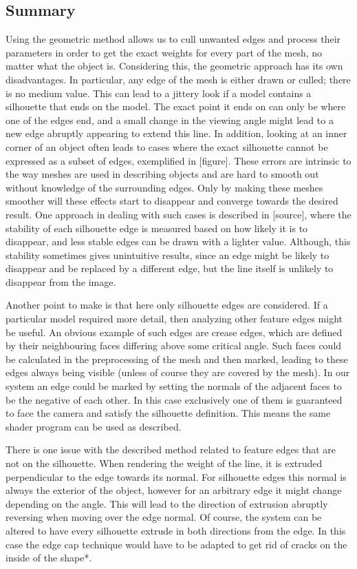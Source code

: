 \documentclass[a4paper, 12pt]{article}
\begin{document}
\subsection{Summary}
Using the geometric method allows us to cull unwanted edges and process their parameters in order to get the exact weights for every part of the mesh, no matter what the object is. Considering this, the geometric approach has its own disadvantages. In particular, any edge of the mesh is either drawn or culled; there is no medium value. This can lead to a jittery look if a model contains a silhouette that ends on the model. The exact point it ends on can only be where one of the edges end, and a small change in the viewing angle might lead to a new edge abruptly appearing to extend this line. In addition, looking at an inner corner of an object often leads to cases where the exact silhouette cannot be expressed as a subset of edges, exemplified in [figure]. These errors are intrinsic to the way meshes are used in describing objects and are hard to smooth out without knowledge of the surrounding edges. Only by making these meshes smoother will these effects start to disappear and converge towards the desired result. One approach in dealing with such cases is described in [source], where the stability of each silhouette edge is measured based on how likely it is to disappear, and less stable edges can be drawn with a lighter value. Although, this stability sometimes gives unintuitive results, since an edge might be likely to disappear and be replaced by a different edge, but the line itself is unlikely to disappear from the image.

Another point to make is that here only silhouette edges are considered. If a particular model required more detail, then analyzing other feature edges might be useful. An obvious example of such edges are crease edges, which are defined by their neighbouring faces differing above some critical angle. Such faces could be calculated in the preprocessing of the mesh and then marked, leading to these edges always being visible (unless of course they are covered by the mesh). In our system an edge could be marked by setting the normals of the adjacent faces to be the negative of each other. In this case exclusively one of them is guaranteed to face the camera and satisfy the silhouette definition. This means the same shader program can be used as described.

There is one issue with the described method related to feature edges that are not on the silhouette. When rendering the weight of the line, it is extruded perpendicular to the edge towards its normal. For silhouette edges this normal is always the exterior of the object, however for an arbitrary edge it might change depending on the angle. This will lead to the direction of extrusion abruptly reversing when moving over the edge normal. Of course, the system can be altered to have every silhouette extrude in both directions from the edge. In this case the edge cap technique would have to be adapted to get rid of cracks on the inside of the shape*.
\end{document}
